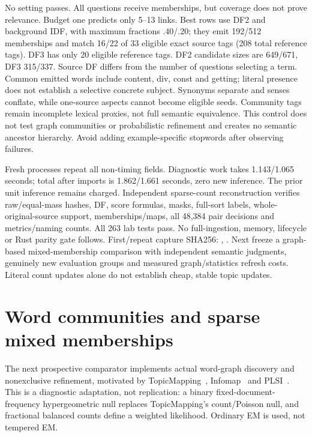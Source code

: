\documentclass[11pt]{article}
\begin{document}
No setting passes. All questions receive memberships, but coverage does not
prove relevance. Budget one predicts only 5--13 links. Best rows use DF2 and
background IDF, with maximum fractions .40/.20; they emit 192/512 memberships
and match 16/22 of 33 eligible exact source tags (208 total reference tags).
DF3 has only 20 eligible reference tags. DF2 candidate sizes are 649/671,
DF3 315/337. Source DF differs from the number of questions selecting a term.
Common emitted words include content, div, const and getting; literal presence
does not establish a selective concrete subject. Synonyms separate and senses
conflate, while one-source aspects cannot become eligible seeds. Community tags
remain incomplete lexical proxies, not full semantic equivalence. This control
does not test graph communities or probabilistic refinement and creates no
semantic ancestor hierarchy. Avoid adding example-specific stopwords after
observing failures.

Fresh processes repeat all non-timing fields. Diagnostic work takes 1.143/1.065
seconds; total after imports is 1.862/1.661 seconds, zero new inference. The
prior unit inference remains charged. Independent sparse-count reconstruction
verifies raw/equal-mass hashes, DF, score formulas, masks, full-sort labels,
whole-original-source support, memberships/maps, all 48,384 pair decisions and
metrics/naming counts. All 263 lab tests pass. No full-ingestion, memory, lifecycle
or Rust parity gate follows. First/repeat capture SHA256:
,
.
Next freeze a graph-based mixed-membership comparison with independent semantic
judgments, genuinely new evaluation groups and measured graph/statistics refresh
costs. Literal count updates alone do not establish cheap, stable topic updates.

\section{Word communities and sparse mixed memberships}
The next prospective comparator implements actual word-graph discovery and
nonexclusive refinement, motivated by TopicMapping~\cite{topicmapping},
Infomap~\cite{infomap2008} and PLSI~\cite{plsi1999}. This is a diagnostic
adaptation, not replication: a binary fixed-document-frequency hypergeometric
null replaces TopicMapping's count/Poisson null, and fractional balanced counts
define a weighted likelihood. Ordinary EM is used, not tempered EM.
\end{document}
